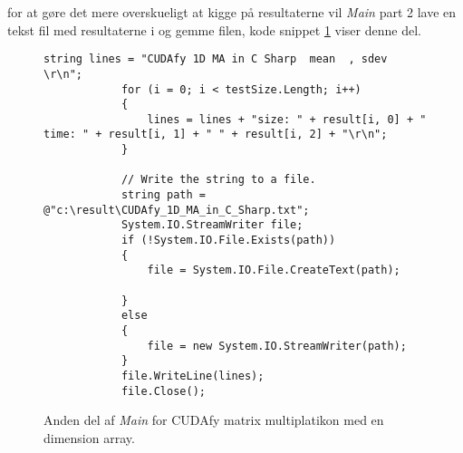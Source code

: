 for at gøre det mere overskueligt at kigge på resultaterne vil \textit{Main} part 2 lave en tekst fil med resultaterne i og gemme filen, kode snippet \ref{fig:MainPart2} viser denne del.


\begin{figure}[!ht]
    \centering
    \lstset{style=sharpc}
	\begin{lstlisting}
string lines = "CUDAfy 1D MA in C Sharp  mean  , sdev \r\n";
            for (i = 0; i < testSize.Length; i++)
            {
                lines = lines + "size: " + result[i, 0] + " time: " + result[i, 1] + " " + result[i, 2] + "\r\n";
            }

            // Write the string to a file.
            string path = @"c:\result\CUDAfy_1D_MA_in_C_Sharp.txt";
            System.IO.StreamWriter file;
            if (!System.IO.File.Exists(path))
            {
                file = System.IO.File.CreateText(path);

            }
            else
            {
                file = new System.IO.StreamWriter(path);
            }
            file.WriteLine(lines);
            file.Close();
	\end{lstlisting}
    \caption{Anden del af \textit{Main} for CUDAfy matrix multiplatikon med en dimension array.}
    \label{fig:MainPart2}
\end{figure}































